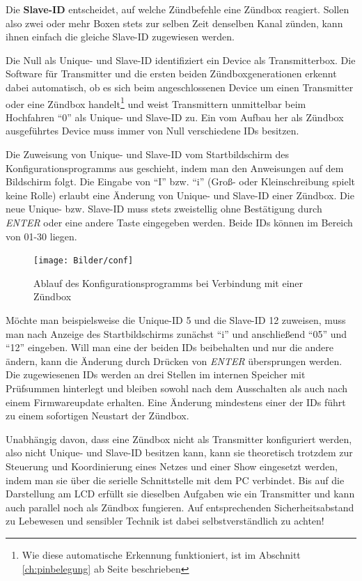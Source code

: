 \documentclass[paper=a4, parskip, numbers=noenddot, toc=listof, headsepline]{scrbook}
\begin{document}
					Die \textbf{Slave-ID} entscheidet, auf welche Zündbefehle eine Zündbox reagiert. Sollen also zwei oder mehr Boxen stets zur selben Zeit denselben Kanal zünden, kann ihnen einfach die gleiche Slave-ID zugewiesen werden.

					Die Null als Unique- und Slave-ID identifiziert ein Device als Transmitterbox. Die Software für Transmitter und die ersten beiden Zündboxgenerationen erkennt dabei automatisch, ob es sich beim angeschlossenen Device um einen Transmitter oder eine Zündbox handelt\footnote{Wie diese automatische Erkennung funktioniert, ist im Abschnitt \ref{ch:pinbelegung} ab Seite \pageref{ch:pinbelegung} beschrieben} und weist Transmittern unmittelbar beim Hochfahren \enquote{0} als Unique- und Slave-ID zu. Ein vom Aufbau her als Zündbox ausgeführtes Device muss immer von Null verschiedene IDs besitzen.

					Die Zuweisung von Unique- und Slave-ID vom Startbildschirm des Konfigurationsprogramms aus geschieht, indem man den Anweisungen auf dem Bildschirm folgt. Die Eingabe von \enquote{I} bzw. \enquote{i} (Groß- oder Kleinschreibung spielt keine Rolle) erlaubt eine Änderung von Unique- und Slave-ID einer Zündbox. Die neue Unique- bzw. Slave-ID muss stets zweistellig ohne Bestätigung durch \emph{ENTER} oder eine andere Taste eingegeben werden. Beide IDs können im Bereich von 01-30 liegen.

					\begin{figure}
						\centering
						\texttt{[image: Bilder/conf]}
						\caption{Ablauf des Konfigurationsprogramms bei Verbindung mit einer Zündbox}
						\label{fig:conf}
					\end{figure}

					Möchte man beispielsweise die Unique-ID 5 und die Slave-ID 12 zuweisen, muss man nach Anzeige des Startbildschirms zunächst \enquote{i} und anschließend \enquote{05} und \enquote{12} eingeben. Will man eine der beiden IDs beibehalten und nur die andere ändern, kann die Änderung durch Drücken von \emph{ENTER} übersprungen werden. Die zugewiesenen IDs werden an drei Stellen im internen Speicher mit Prüfsummen hinterlegt und bleiben sowohl nach dem Ausschalten als auch nach einem Firmwareupdate erhalten. Eine Änderung mindestens einer der IDs führt zu einem sofortigen Neustart der Zündbox.

					Unabhängig davon, dass eine Zündbox nicht als Transmitter konfiguriert werden, also nicht Unique- und Slave-ID  besitzen kann, kann sie theoretisch trotzdem zur Steuerung und Koordinierung eines Netzes und einer Show eingesetzt werden, indem man sie über die serielle Schnittstelle mit dem PC verbindet. Bis auf die Darstellung am LCD erfüllt sie dieselben Aufgaben wie ein Transmitter und kann auch parallel noch als Zündbox fungieren. Auf entsprechenden Sicherheitsabstand zu Lebewesen und sensibler Technik ist dabei selbstverständlich zu achten!
\end{document}

